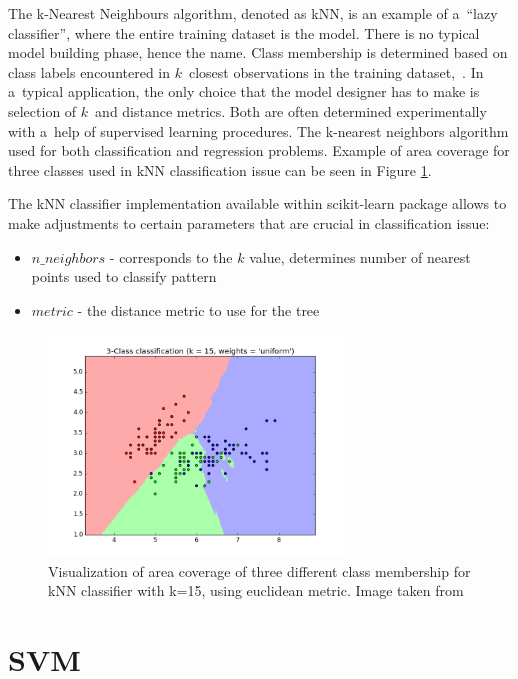 The k-Nearest Neighbours algorithm, denoted as kNN, is an example of a~``lazy classifier'', where the entire training dataset is the model. There is no typical model building phase, hence the name. Class membership is determined based on class labels encountered in $k$~closest observations in the training dataset,~\cite{Altman1992}. In a~typical application, the only choice that the model designer has to make is selection of $k$~and distance metrics. Both are often determined experimentally with a~help of supervised learning procedures.  The k-nearest neighbors algorithm used for both classification and regression problems\cite{Altman1992}. Example of area coverage for three classes used in kNN classification issue can be seen in Figure \ref{fig:knn_schema}.

The kNN classifier implementation available within scikit-learn package allows to make adjustments to certain parameters that are crucial in classification issue:
\begin{itemize}
	\item $n\_neighbors$ - corresponds to the $k$ value, determines number of nearest points used to classify pattern
	\item $metric$ - the distance metric to use for the tree
\end{itemize}

\begin{figure}[htp]
	\centering
	\includegraphics[width=0.7\textwidth]{Figures/knn_schema.png}
	\caption{Visualization of area coverage of three different class membership for kNN classifier with k=15, using euclidean metric. Image taken from \cite{Scikit-Learn_Website}}
	\label{fig:knn_schema}\vspace{-3pt}
\end{figure}

\section{SVM}

